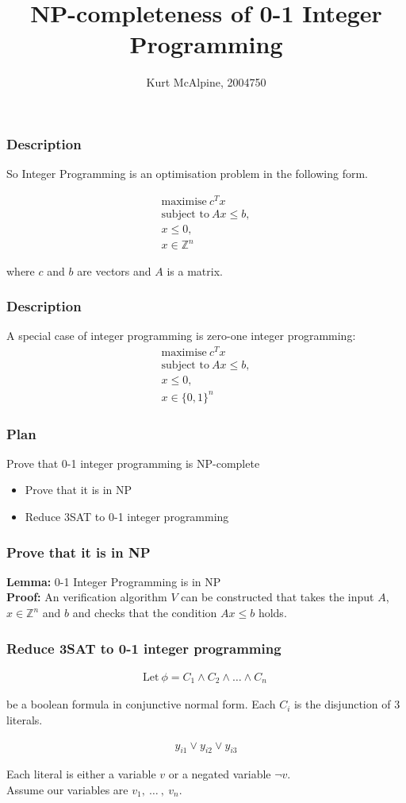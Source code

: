 \documentclass[mathserif]{beamer}
\title{NP-completeness of 0-1 Integer Programming}
\author{Kurt McAlpine, 2004750}
\begin{document}
\frame{\titlepage}

\begin{frame}
\frametitle{Description}
So Integer Programming is an optimisation problem in the following form.

\begin{align*}
\text{maximise}\ c^Tx\\
\text{subject to}\ Ax \leq b,\\
x \leq 0,\\
x \in \mathbb{Z}^n
\end{align*}

where $c$ and $b$ are vectors and $A$ is a matrix.

\end{frame}

\begin{frame}
\frametitle{Description}
A special case of integer programming is zero-one integer programming:
\begin{align*}
\text{maximise}\ c^Tx\\
\text{subject to}\ Ax \leq b,\\
x \leq 0,\\
x \in \{0, 1\}^n
\end{align*}
\end{frame}

\begin{frame}
\frametitle{Plan}
Prove that 0-1 integer programming is NP-complete
\begin{itemize}
\item Prove that it is in NP
\item Reduce 3SAT to 0-1 integer programming
\end{itemize}
\end{frame}

\begin{frame}
\frametitle{Prove that it is in NP}
\textbf{Lemma:} 0-1 Integer Programming is in NP\\
\textbf{Proof:} An verification algorithm $V$ can be constructed that takes the input $A$, $x \in \mathbb{Z}^n$ and $b$
and checks that the condition $Ax \leq b$ holds.
\end{frame}

\begin{frame}
\frametitle{Reduce 3SAT to 0-1 integer programming}
\begin{align*}
\text{Let}\ \phi = C_1 \wedge C_2 \wedge \ldots \wedge C_n\
\end{align*}
\begin{center}
be a boolean formula in conjunctive normal form. Each $C_i$ is the disjunction of 3 literals.
\end{center}
\begin{align*}
y_{i1} \vee y_{i2} \vee y_{i3}
\end{align*}

\begin{center}
Each literal is either a variable $v$ or a negated variable $\neg v$.\\

Assume our variables are $v_1,\ \ldots\ ,\ v_n$.
\end{center}

\end{frame}
\end{document}
